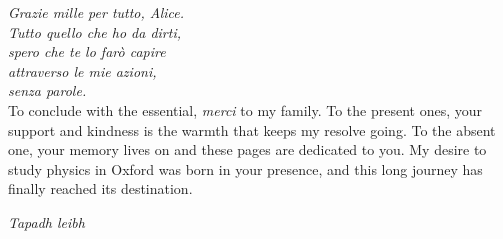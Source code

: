 \noindent\textit{Grazie mille per tutto, Alice.}\\
\noindent\textit{Tutto quello che ho da dirti,}\\
\noindent\textit{spero che te lo farò capire}\\
\noindent\textit{attraverso le mie azioni,}\\
\noindent\textit{senza parole.} \\

To conclude with the essential, \textit{merci} to my family. To the present ones, your support and kindness is the warmth that keeps my resolve going. To the absent one, your memory lives on and these pages are dedicated to you. My desire to study physics in Oxford was born in your presence, and this long journey has finally reached its destination. \\
\begin{center}
\textit{\color{oxfordblue} Tapadh leibh}
\end{center}